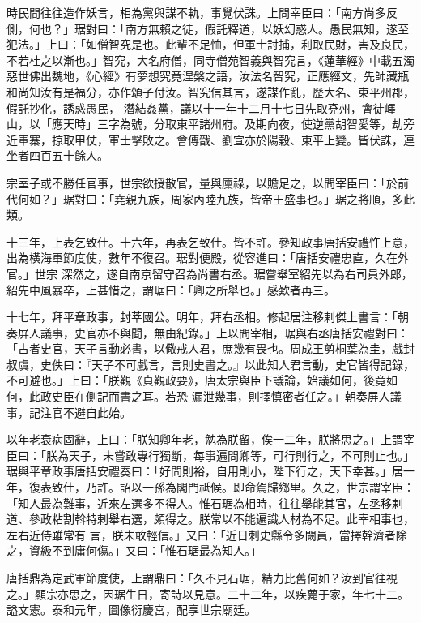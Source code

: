 \begin{pinyinscope}
 時民間往往造作妖言，相為黨與謀不軌，事覺伏誅。上問宰臣曰：「南方尚多反側，何也？」琚對曰：「南方無賴之徒，假託釋道，以妖幻惑人。愚民無知，遂至犯法。」上曰：「如僧智究是也。此輩不足恤，但軍士討捕，利取民財，害及良民，不若杜之以漸也。」智究，大名府僧，同寺僧苑智義與智究言，《蓮華經》中載五濁惡世佛出魏地，《心經》有夢想究竟涅槃之語，汝法名智究，正應經文，先師藏瓶和尚知汝有是福分，亦作頌子付汝。智究信其言，遂謀作亂，歷大名、東平州郡，假託抄化，誘惑愚民，
 潛結姦黨，議以十一年十二月十七日先取兗州，會徒嶧山，以「應天時」三字為號，分取東平諸州府。及期向夜，使逆黨胡智愛等，劫旁近軍寨，掠取甲仗，軍士擊敗之。會傅戩、劉宣亦於陽穀、東平上變。皆伏誅，連坐者四百五十餘人。



 宗室子或不勝任官事，世宗欲授散官，量與廩祿，以贍足之，以問宰臣曰：「於前代何如？」琚對曰：「堯親九族，周家內睦九族，皆帝王盛事也。」琚之將順，多此類。



 十三年，上表乞致仕。十六年，再表乞致仕。皆不許。參知政事唐括安禮忤上意，出為橫海軍節度使，數年不復召。琚對便殿，從容進曰：「唐括安禮忠直，久在外官。」世宗
 深然之，遂自南京留守召為尚書右丞。琚嘗舉室紹先以為右司員外郎，紹先中風暴卒，上甚惜之，謂琚曰：「卿之所舉也。」感歎者再三。



 十七年，拜平章政事，封莘國公。明年，拜右丞相。修起居注移剌傑上書言：「朝奏屏人議事，史官亦不與聞，無由紀錄。」上以問宰相，琚與右丞唐括安禮對曰：「古者史官，天子言動必書，以儆戒人君，庶幾有畏也。周成王剪桐葉為圭，戲封叔虞，史佚曰：『天子不可戲言，言則史書之。』以此知人君言動，史官皆得記錄，不可避也。」上曰：「朕觀《貞觀政要》，唐太宗與臣下議論，始議如何，後竟如何，此政史臣在側記而書之耳。若恐
 漏泄幾事，則擇慎密者任之。」朝奏屏人議事，記注官不避自此始。



 以年老衰病固辭，上曰：「朕知卿年老，勉為朕留，俟一二年，朕將思之。」上謂宰臣曰：「朕為天子，未嘗敢專行獨斷，每事遍問卿等，可行則行之，不可則止也。」琚與平章政事唐括安禮奏曰：「好問則裕，自用則小，陛下行之，天下幸甚。」居一年，復表致仕，乃許。詔以一孫為閣門祗候。即命駕歸鄉里。久之，世宗謂宰臣：「知人最為難事，近來左選多不得人。惟石琚為相時，往往舉能其官，左丞移剌道、參政粘割斡特剌舉右選，頗得之。朕常以不能遍識人材為不足。此宰相事也，左右近侍雖常有
 言，朕未敢輕信。」又曰：「近日刺史縣令多闕員，當擇幹濟者除之，資級不到庸何傷。」又曰：「惟石琚最為知人。」



 唐括鼎為定武軍節度使，上謂鼎曰：「久不見石琚，精力比舊何如？汝到官往視之。」顯宗亦思之，因琚生日，寄詩以見意。二十二年，以疾薨于家，年七十二。謚文憲。泰和元年，圖像衍慶宮，配享世宗廟廷。




\end{pinyinscope}
